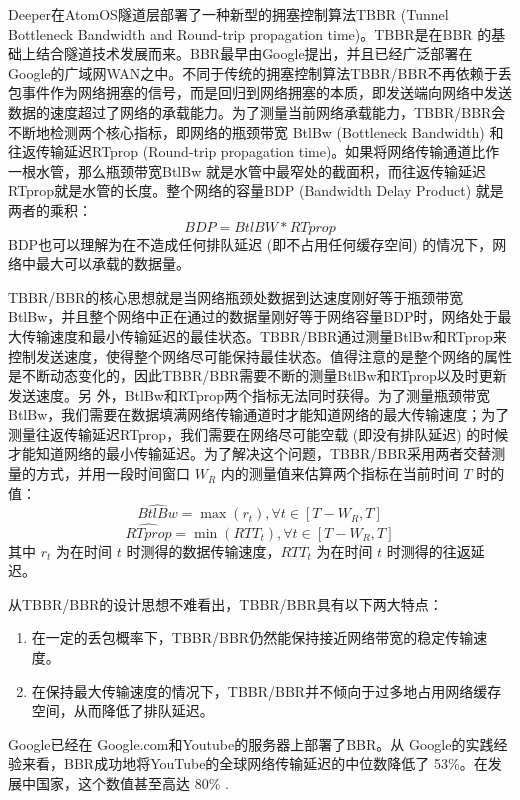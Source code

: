 \documentclass[a4paper]{article}
\begin{document}
Deeper在AtomOS隧道层部署了一种新型的拥塞控制算法TBBR (Tunnel Bottleneck Bandwidth and Round-trip propagation time)。TBBR是在BBR \cite{cardwell2016bbr} 的基础上结合隧道技术发展而来。BBR最早由Google提出，并且已经广泛部署在Google的广域网WAN之中。不同于传统的拥塞控制算法TBBR/BBR不再依赖于丢包事件作为网络拥塞的信号，而是回归到网络拥塞的本质，即发送端向网络中发送数据的速度超过了网络的承载能力。为了测量当前网络承载能力，TBBR/BBR会不断地检测两个核心指标，即网络的瓶颈带宽 BtlBw (Bottleneck Bandwidth) 和往返传输延迟RTprop (Round-trip propagation time)。如果将网络传输通道比作一根水管，那么瓶颈带宽BtlBw 就是水管中最窄处的截面积，而往返传输延迟RTprop就是水管的长度。整个网络的容量BDP (Bandwidth Delay Product) 就是两者的乘积：
\begin{equation}
BDP = BtlBW * RTprop
\end{equation}
BDP也可以理解为在不造成任何排队延迟 (即不占用任何缓存空间) 的情况下，网络中最大可以承载的数据量。

TBBR/BBR的核心思想就是当网络瓶颈处数据到达速度刚好等于瓶颈带宽BtlBw，并且整个网络中正在通过的数据量刚好等于网络容量BDP时，网络处于最大传输速度和最小传输延迟的最佳状态。TBBR/BBR通过测量BtlBw和RTprop来控制发送速度，使得整个网络尽可能保持最佳状态。值得注意的是整个网络的属性是不断动态变化的，因此TBBR/BBR需要不断的测量BtlBw和RTprop以及时更新发送速度。另
外，BtlBw和RTprop两个指标无法同时获得。为了测量瓶颈带宽BtlBw，我们需要在数据填满网络传输通道时才能知道网络的最大传输速度；为了测量往返传输延迟RTprop，我们需要在网络尽可能空载 (即没有排队延迟) 的时候才能知道网络的最小传输延迟。为了解决这个问题，TBBR/BBR采用两者交替测量的方式，并用一段时间窗口 $W_R$ 内的测量值来估算两个指标在当前时间 $T$ 时的值：
\begin{equation}
\hat{BtlBw} = \max(r_t), \forall t \in [T - W_R, T]
\end{equation}
\begin{equation}
\hat{RTprop} = \min(RTT_t), \forall t \in [T - W_R, T]
\end{equation}
其中 $r_t$ 为在时间 $t$ 时测得的数据传输速度，$RTT_t$ 为在时间 $t$ 时测得的往返延迟。

从TBBR/BBR的设计思想不难看出，TBBR/BBR具有以下两大特点：
\begin{enumerate}
\item 在一定的丢包概率下，TBBR/BBR仍然能保持接近网络带宽的稳定传输速度。
\item 在保持最大传输速度的情况下，TBBR/BBR并不倾向于过多地占用网络缓存空间，从而降低了排队延迟。
\end{enumerate}
Google已经在 Google.com和Youtube的服务器上部署了BBR。从 Google的实践经验来看，BBR成功地将YouTube的全球网络传输延迟的中位数降低了 53\%。在发展中国家，这个数值甚至高达 80\% \cite{cardwell2016bbr}.
\end{document}
